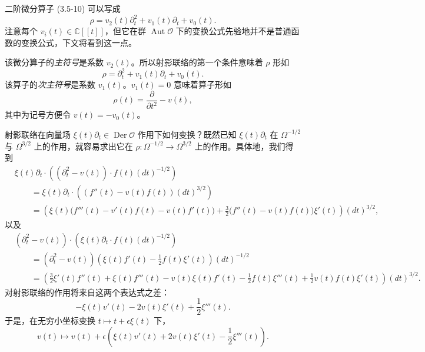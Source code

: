 二阶微分算子 (3.5-10) 可以写成
\[
    \rho=v_2(t)\partial_t^2+v_1(t)\partial_t+v_0(t).
\]
注意每个 $v_i(t)\in\mathbb{C}[[t]]$，但它在群 $\operatorname{Aut}\mathcal{O}$ 下的变换公式先验地并不是普通函数的变换公式，下文将看到这一点。

该微分算子的\emph{主符号}是系数 $v_2(t)$。所以射影联络的第一个条件意味着 $\rho$ 形如
\[
    \rho=\partial_t^2+v_1(t)\partial_t+v_0(t).
\]
该算子的\emph{次主符号}是系数 $v_1(t)$。$v_1(t)=0$ 意味着算子形如
\[
    \rho(t)=\frac{\partial}{\partial t^2}-v(t),
\]
其中为记号方便令 $v(t)=-v_0(t)$。


射影联络在向量场 $\xi(t)\partial_t\in\operatorname{Der}\mathcal{O}$ 作用下如何变换？既然已知 $\xi(t)\partial_t$ 在 $\Omega^{-1/2}$ 与 $\Omega^{3/2}$ 上的作用，就容易求出它在 $\rho:\Omega^{-1/2}\to\Omega^{3/2}$ 上的作用。具体地，我们得到
\begin{align*}
    &\xi(t)\partial_t\cdot\left((\partial_t^2-v(t))\cdot f(t)(dt)^{-1/2}\right)\\
    &\qquad=\xi(t)\partial_t\cdot\left((f''(t)-v(t)f(t))(dt)^{3/2}\right)\\
    &\qquad=\left(\xi(t)\big(f'''(t)-v'(t)f(t)-v(t)f'(t)\big)
      +\frac32\big(f''(t)-v(t)f(t)\big)\xi'(t)\right)(dt)^{3/2},
\end{align*}
以及
\begin{align*}
    &(\partial_t^2-v(t))\cdot\left(\xi(t)\partial_t\cdot f(t)(dt)^{-1/2}\right)\\
    &\qquad=(\partial_t^2-v(t))\left(\xi(t)f'(t)-\frac12 f(t)\xi'(t)\right)(dt)^{-1/2}\\
    &\qquad=\left(\frac32\xi'(t)f''(t)+\xi(t)f'''(t)-v(t)\xi(t)f'(t)
      -\frac12 f(t)\xi'''(t)+\frac12 v(t)f(t)\xi'(t)\right)(dt)^{3/2}.
\end{align*}
对射影联络的作用将来自这两个表达式之差：
\[
    -\xi(t)v'(t)-2v(t)\xi'(t)+\frac12\xi'''(t).
\]
于是，在无穷小坐标变换 $t\mapsto t+\epsilon\xi(t)$ 下，
\begin{equation}
    v(t)\longmapsto v(t)+\epsilon\left(\xi(t)v'(t)+2v(t)\xi'(t)-\frac12\xi'''(t)\right).
    \tag{3.5-11}
\end{equation}


